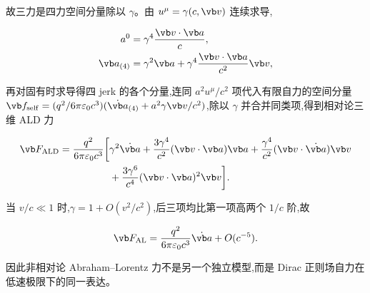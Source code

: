 故三力是四力空间分量除以 $\gamma$。由 $u^\mu=\gamma(c,\vb v)$ 连续求导,

\begin{align*}
 a^0&=\gamma^4{\vb v\cdot\vb a\over c},\\
 \vb a_{(4)}&=\gamma^2\vb a
 +\gamma^4{\vb v\cdot\vb a\over c^2}\vb v,
\end{align*}

再对固有时求导得四 jerk 的各个分量,连同 $a^2u^\mu/c^2$ 项代入有限自力的空间分量 $\vb f_{\mathrm{self}}=(q^2/6\pi\varepsilon_0c^3)(\dot{\vb a}_{(4)}+a^2\gamma\vb v/c^2)$,除以 $\gamma$ 并合并同类项,得到相对论三维 ALD 力

\begin{align*}
 \vb F_{\mathrm{ALD}}
 ={q^2\over6\pi\varepsilon_0c^3}
 \bigg[{}
 &\gamma^2\dot{\vb a}
 +{3\gamma^4\over c^2}(\vb v\cdot\vb a)\vb a
 +{\gamma^4\over c^2}(\vb v\cdot\dot{\vb a})\vb v\\
 &+{3\gamma^6\over c^4}(\vb v\cdot\vb a)^2\vb v
 \bigg].
\end{align*}

当 $v/c\ll1$ 时,$\gamma=1+O(v^2/c^2)$,后三项均比第一项高两个 $1/c$ 阶,故

\begin{equation*}
 \vb F_{\mathrm{AL}}
 ={q^2\over6\pi\varepsilon_0c^3}\dot{\vb a}
 +O(c^{-5}).
\end{equation*}

因此非相对论 Abraham--Lorentz 力不是另一个独立模型,而是 Dirac 正则场自力在低速极限下的同一表达。
